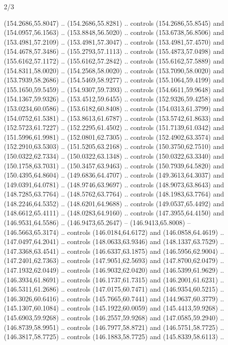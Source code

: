 \begin{flagdescription}{2/3}
\begin{scope}[xshift=0.5\flaglength,yshift=0.5\flagwidth,scale=\flagwidth/180]
\begin{scope}[y=0.8pt, x=0.8pt, yscale=-1,shift={(-168.75,-108.75)}]
  (154.2686,55.8047) .. (154.2686,55.8281) .. controls (154.2686,55.8545) and
  (154.0957,56.1563) .. (153.8848,56.5020) .. controls (153.6738,56.8506) and
  (153.4981,57.2109) .. (153.4981,57.3047) .. controls (153.4981,57.4570) and
  (154.4678,57.3486) .. (155.2793,57.1113) .. controls (155.4873,57.0498) and
  (155.6162,57.1172) .. (155.6162,57.2842) .. controls (155.6162,57.5889) and
  (154.8311,58.0020) .. (154.2568,58.0020) .. controls (153.7090,58.0020) and
  (153.7939,58.2686) .. (154.5469,58.9277) .. controls (155.1064,59.4199) and
  (155.1650,59.5459) .. (154.9307,59.7393) .. controls (154.6611,59.9648) and
  (154.1367,59.9326) .. (153.4512,59.6455) .. controls (152.9326,59.4258) and
  (153.0234,60.0586) .. (153.6182,60.8408) .. controls (154.0313,61.3799) and
  (154.0752,61.5381) .. (153.8613,61.6787) .. controls (153.5742,61.8633) and
  (152.5723,61.7227) .. (152.2295,61.4502) .. controls (151.7139,61.0342) and
  (151.5996,61.9981) .. (152.0801,62.7305) .. controls (152.4902,63.3574) and
  (152.2910,63.5303) .. (151.5205,63.2168) .. controls (150.3750,62.7510) and
  (150.0322,62.7334) .. (150.0322,63.1348) .. controls (150.0322,63.3340) and
  (150.1758,63.7031) .. (150.3457,63.9463) .. controls (150.7939,64.5820) and
  (150.4395,64.8604) .. (149.6836,64.4707) .. controls (149.3613,64.3037) and
  (149.0391,64.0781) .. (148.9746,63.9697) .. controls (148.9073,63.8643) and
  (148.7285,63.7764) .. (148.5762,63.7764) .. controls (148.1983,63.7764) and
  (148.2246,64.5352) .. (148.6201,64.9688) .. controls (149.0537,65.4492) and
  (148.6612,65.4111) .. (148.0283,64.9160) .. controls (147.3955,64.4150) and
  (146.9531,64.5586) .. (146.9473,65.2647) -- (146.9413,65.8008) --
  (146.5663,65.3174) .. controls (146.0184,64.6172) and (146.0858,64.4619) ..
  (147.0497,64.2041) .. controls (148.0633,63.9346) and (148.1337,63.7529) ..
  (147.3368,63.4541) .. controls (146.6337,63.1875) and (146.5956,62.9004) ..
  (147.2401,62.7363) .. controls (147.9051,62.5693) and (147.8700,62.0479) ..
  (147.1932,62.0449) .. controls (146.9032,62.0420) and (146.5399,61.9629) ..
  (146.3934,61.8691) .. controls (146.1737,61.7315) and (146.2001,61.6231) ..
  (146.5311,61.2686) .. controls (147.0175,60.7471) and (146.9354,60.5215) ..
  (146.3026,60.6416) .. controls (145.7665,60.7441) and (144.9637,60.3779) ..
  (145.1307,60.1084) .. controls (145.1922,60.0059) and (145.4413,59.9268) ..
  (145.6903,59.9268) .. controls (146.2557,59.9268) and (147.0585,59.2940) ..
  (146.8739,58.9951) .. controls (146.7977,58.8721) and (146.5751,58.7725) ..
  (146.3817,58.7725) .. controls (146.1883,58.7725) and (145.8339,58.6113) ..

\end{scope}
\end{scope}
\end{flagdescription}

